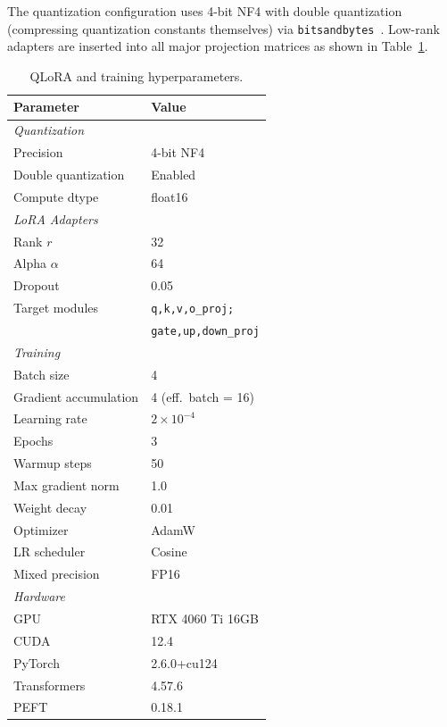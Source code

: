 \documentclass[twocolumn]{article}
\begin{document}
The quantization configuration uses 4-bit NF4 with double quantization (compressing
quantization constants themselves) via \texttt{bitsandbytes}~\cite{dettmers2022llmint8}.
Low-rank adapters are inserted into all major projection matrices as shown in
Table~\ref{tab:qlora_config}.

\begin{table}[h]
\centering
\caption{QLoRA and training hyperparameters.}
\label{tab:qlora_config}
\begin{tabular}{ll}
\toprule
\textbf{Parameter} & \textbf{Value} \\
\midrule
\multicolumn{2}{l}{\textit{Quantization}} \\
Precision & 4-bit NF4 \\
Double quantization & Enabled \\
Compute dtype & float16 \\
\midrule
\multicolumn{2}{l}{\textit{LoRA Adapters}} \\
Rank $r$ & 32 \\
Alpha $\alpha$ & 64 \\
Dropout & 0.05 \\
Target modules & \texttt{q,k,v,o\_proj;} \\
 & \texttt{gate,up,down\_proj} \\
\midrule
\multicolumn{2}{l}{\textit{Training}} \\
Batch size & 4 \\
Gradient accumulation & 4 (eff.\ batch = 16) \\
Learning rate & $2 \times 10^{-4}$ \\
Epochs & 3 \\
Warmup steps & 50 \\
Max gradient norm & 1.0 \\
Weight decay & 0.01 \\
Optimizer & AdamW \\
LR scheduler & Cosine \\
Mixed precision & FP16 \\
\midrule
\multicolumn{2}{l}{\textit{Hardware}} \\
GPU & RTX 4060 Ti 16GB \\
CUDA & 12.4 \\
PyTorch & 2.6.0+cu124 \\
Transformers & 4.57.6 \\
PEFT & 0.18.1 \\
\bottomrule
\end{tabular}
\end{table}
\end{document}
